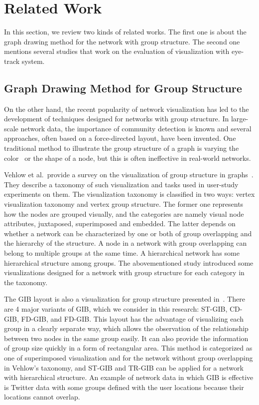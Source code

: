 \documentclass[review]{vgtc}                 %
\begin{document}
%
\section{Related Work}
%
In this section, we review two kinds of related works.
The first one is about the graph drawing method for the network with group structure.
The second one mentions several studies that work on the evaluation of visualization with eye-track system.


\subsection{Graph Drawing Method for Group Structure}

On the other hand, the recent popularity of network visualization has led to the development of techniques designed for networks with group structure.
In large-scale network data, the importance of community detection is known and several approaches, often based on a force-directed layout, have been invented. One traditional method to illustrate the group structure of a graph is varying the color~\cite{mcpherson2005discovering} or the shape of a node, but this is often ineffective in real-world networks.

Vehlow et al.\ provide a survey on the visualization of group structure in graphs~\cite{Vehlow2017VisualizingGS}.
They describe a taxonomy of such visualization and tasks used in user-study experiments on them.
The visualization taxonomy is classified in two ways: vertex visualization taxonomy and vertex group structure.
The former one represents how the nodes are grouped visually, and the categories are namely visual node attributes, juxtaposed, superimposed and embedded.
The latter depends on whether a network can be characterized by one or both of group overlapping and the hierarchy of the structure.
A node in a network with group overlapping can belong to multiple groups at the same time.
A hierarchical network has some hierarchical structure among groups.
The abovementioned study introduced some visualizations designed for a network with group structure for each category in the taxonomy.

The GIB layout is also a visualization for group structure presented in~\cite{rodrigues2011group,chaturvedi2014group,onoue2017optimal}.
There are 4 major variants of GIB, which we consider in this research: ST-GIB, CD-GIB, FD-GIB, and FD-GIB.
This layout has the advantage of visualizing each group in a clearly separate way, which allows the observation of the relationship between two nodes in the same group easily.
It can also provide the information of group size quickly in a form of rectangular area.
This method is categorized as one of superimposed visualization and for the network without group overlapping in Vehlow's taxonomy, and ST-GIB and TR-GIB can be applied for a network with hierarchical structure.
An example of network data in which GIB is effective is Twitter data with some groups defined with the user locations because their locations cannot overlap.
\end{document}
